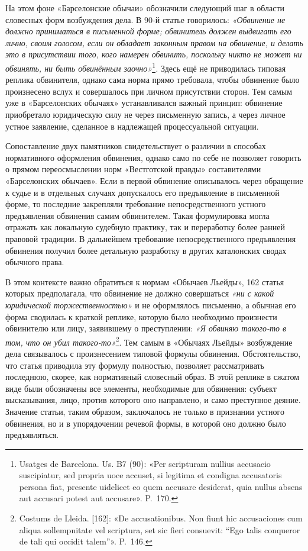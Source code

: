 На этом фоне «Барселонские обычаи» обозначили следующий шаг в области словесных форм возбуждения дела. В 90-й статье говорилось: \emph{«Обвинение не должно приниматься в письменной форме; обвинитель должен выдвигать его лично, своим голосом, если он обладает законным правом на обвинение, и делать это в присутствии того, кого намерен обвинить, поскольку никто не может ни обвинять, ни быть обвинённым заочно»}\footnote{Usatges de Barcelona. Us. B7 (90): «Per scripturam nullius accusacio suscipiatur, sed propria uoce accuset, si legitima et condigna accusatoris persona fiat, presente uidelicet eo quem accusare desiderat, quia nullus absens aut accusari potest aut accusare». P.~170.}\emph{.} Здесь ещё не приводилась типовая реплика обвинителя, однако сама норма прямо требовала, чтобы обвинение было произнесено вслух и совершалось при личном присутствии сторон. Тем самым уже в «Барселонских обычаях» устанавливался важный принцип: обвинение приобретало юридическую силу не через письменную запись, а через личное устное заявление, сделанное в надлежащей процессуальной ситуации.

Сопоставление двух памятников свидетельствует о различии в способах нормативного оформления обвинения, однако само по себе не позволяет говорить о прямом переосмыслении норм «Вестготской правды» составителями «Барселонских обычаев». Если в первой обвинение описывалось через обращение к судье и в отдельных случаях допускалось его предъявление в письменной форме, то последние закрепляли требование непосредственного устного предъявления обвинения самим обвинителем. Такая формулировка могла отражать как локальную судебную практику, так и переработку более ранней правовой традиции. В дальнейшем требование непосредственного предъявления обвинения получил более детальную разработку в других каталонских сводах обычного права.

В этом контексте важно обратиться к нормам «Обычаев Льейды», 162 статья которых предполагала, что обвинение не должно совершаться \emph{«ни с какой юридической торжественностью»} и не оформлялось письменно, а обычная его форма сводилась к краткой реплике, которую было необходимо произнести обвинителю или лицу, заявившему о преступлении: \emph{«Я обвиняю такого-то в том, что он убил такого-то»}\footnote{Costums de Lleida. [162]: «De accusationibus. Non fiunt hic accusaciones cum aliqua sollempnitate vel scriptura, set sic fieri consuevit: “Ego talis conqueror de tali qui occidit talem”». P.~146.}. Тем самым в «Обычаях Льейды» возбуждение дела связывалось с произнесением типовой формулы обвинения. Обстоятельство, что статья приводила эту формулу полностью, позволяет рассматривать последнюю, скорее, как нормативный словесный образ. В этой реплике в сжатом виде были обозначены все элементы, необходимые для обвинения: субъект высказывания, лицо, против которого оно направлено, и само преступное деяние. Значение статьи, таким образом, заключалось не только в признании устного обвинения, но и в упорядочении речевой формы, в которой оно должно было предъявляться.

